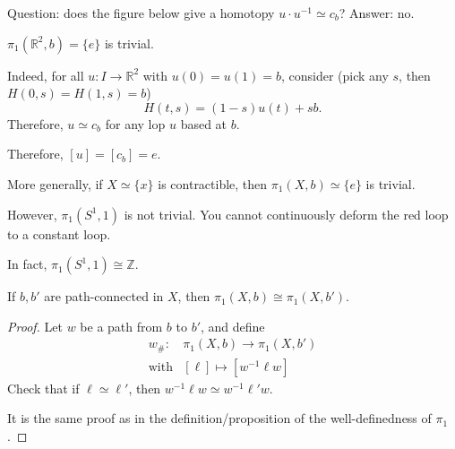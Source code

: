 Question:
does the figure below give a homotopy $u\cdot u^{-1}\simeq c_b$?
Answer: no.

\begin{example}
$\pi_1(\mathbb{R}^2,b) = \{e\}$ is trivial.

Indeed, for all $u:I\to\mathbb{R}^2$ with $u(0)=u(1)=b$, consider (pick any $s$, then $H(0,s)=H(1,s)=b$)
\[
H(t,s) = (1-s)u(t)+sb.
\]
Therefore, $u\simeq c_b$ for any lop $u$ based at $b$.

Therefore, $[u] = [c_b] = e$.

More generally, if $X\simeq\{x\}$ is contractible, then $\pi_1(X,b)\simeq\{e\}$ is trivial.

However, $\pi_1(S^1,1)$ is not trivial.
You cannot continuously deform the red loop to a constant loop.

In fact, $\pi_1(S^1,1) \cong\mathbb{Z}$.
\end{example}

\begin{proposition}
If $b,b'$ are path-connected in $X$, then $\pi_1(X,b)\cong\pi_1(X,b')$.
\end{proposition}
\begin{proof}
Let $w$ be a path from $b$ to $b'$, and define
\[
\begin{array}{ll}
w_{\#}:&\pi_1(X,b)\to\pi_1(X,b')\\
\text{with}&[\ell]\mapsto[w^{-1}\ell w]
\end{array}
\]
Check that if $\ell\simeq\ell'$, then $w^{-1}\ell w\simeq w^{-1}\ell' w$.

It is the same proof as in the definition/proposition of the well-definedness of $\pi_1$.

\end{proof}



















